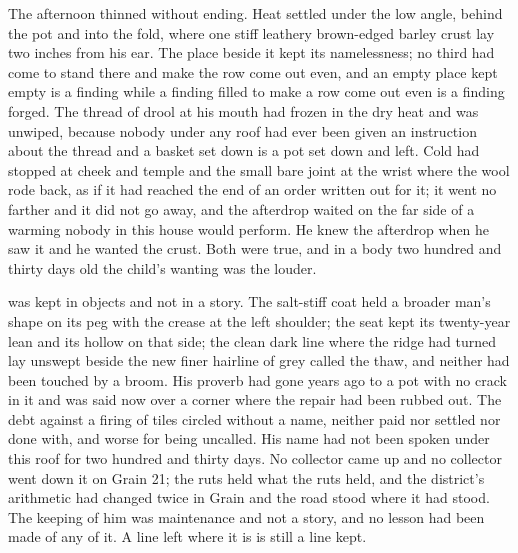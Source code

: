 The afternoon thinned without ending. Heat settled under the low angle, behind the pot and into the fold, where one stiff leathery brown-edged barley crust lay two inches from his ear. The place beside it kept its namelessness; no third had come to stand there and make the row come out even, and an empty place kept empty is a finding while a finding filled to make a row come out even is a finding forged. The thread of drool at his mouth had frozen in the dry heat and was unwiped, because nobody under any roof had ever been given an instruction about the thread and a basket set down is a pot set down and left. Cold had stopped at cheek and temple and the small bare joint at the wrist where the wool rode back, as if it had reached the end of an order written out for it; it went no farther and it did not go away, and the afterdrop waited on the far side of a warming nobody in this house would perform. He knew the afterdrop when he saw it and he wanted the crust. Both were true, and in a body two hundred and thirty days old the child's wanting was the louder.

 was kept in objects and not in a story. The salt-stiff coat held a broader man's shape on its peg with the crease at the left shoulder; the seat kept its twenty-year lean and its hollow on that side; the clean dark line where the  ridge had turned lay unswept beside the new finer hairline of grey called the thaw, and neither had been touched by a broom. His proverb had gone years ago to a pot with no crack in it and was said now over a corner where the repair had been rubbed out. The debt against a firing of tiles circled without a name, neither paid nor settled nor done with, and worse for being uncalled. His name had not been spoken under this roof for two hundred and thirty days. No collector came up  and no collector went down it on Grain 21; the ruts held what the ruts held, and the district's arithmetic had changed twice in Grain and the road stood where it had stood. The keeping of him was maintenance and not a story, and no lesson had been made of any of it. A line left where it is is still a line kept.


